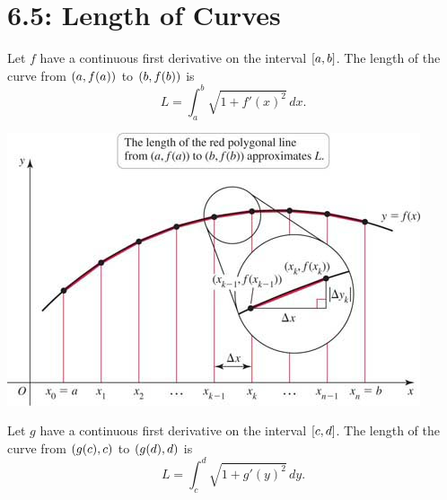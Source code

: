 \documentclass[../mathNotesPreamble]{subfiles}
\begin{document}
  \section{6.5: Length of Curves}

  \begin{defn*}[Arc Length for $y=f(x)$]
    Let $f$ have a continuous first derivative on the interval ${\left[a,b\right]}$. The length of the curve from ${\left(a, f(a)\right)}$ to ${\left(b, f(b)\right)}$ is
      \[L=\int_a^b \sqrt{1+f'(x)^2}\,dx.\]
  \end{defn*}

  \begin{center}
    \includegraphics[width=0.6\linewidth]{../images/briggs_06_05/fig06_55}
  \end{center}
  
  \begin{defn*}[Arc Length for $x=g(y)$]
    Let $g$ have a continuous first derivative on the interval ${\left[c,d\right]}$. The length of the curve from ${\left(g(c),c\right)}$ to ${\left(g(d),d\right)}$ is
      \[L=\int_c^d \sqrt{1+g'(y)^2}\,dy.\]
  \end{defn*}
  \pagebreak
\end{document}
